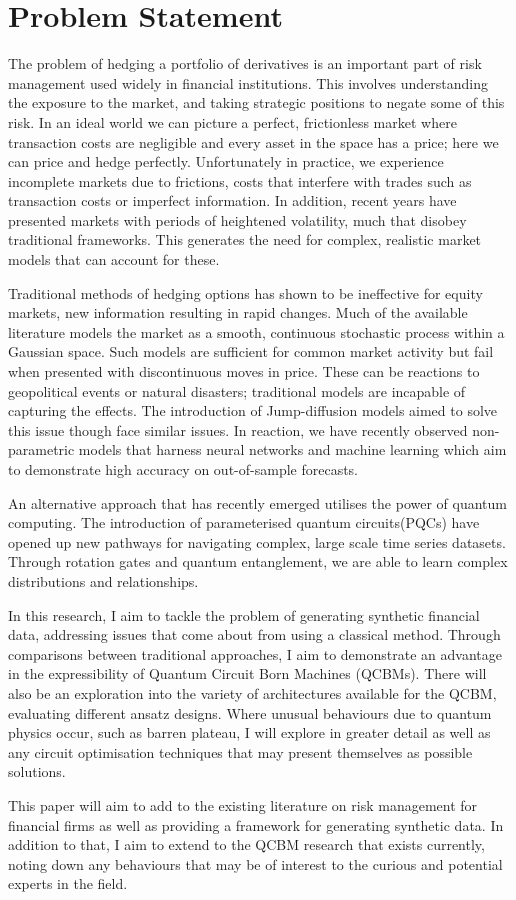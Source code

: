 \documentclass[12pt]{article}
\newcommand{\newp}
    {
    \vskip 0.5cm 
  }
\numberwithin{equation}{section}
\begin{document}
\section{Problem Statement}
The problem of hedging a portfolio of derivatives is an important part of 
risk management used widely in financial institutions. This involves understanding 
the exposure to the market, and taking strategic positions to negate some of this 
risk. In an ideal world we can picture a perfect, 
frictionless market where transaction costs are negligible and every asset in 
the space has a price; here we can price and hedge perfectly. Unfortunately in 
practice, we experience incomplete markets due to frictions, costs that interfere 
with trades such as transaction costs or imperfect information. In addition, recent 
years have presented markets with periods of heightened volatility, much that disobey 
traditional frameworks. This generates the need for complex, realistic market 
models that can account for these.
\newp
Traditional methods of hedging options has shown to be ineffective for equity 
markets, new information resulting in rapid changes. Much of the available 
literature models the market as a smooth, continuous stochastic process within 
a Gaussian space. Such models are sufficient for common market activity but fail 
when presented with discontinuous moves in price. These can be reactions to 
geopolitical events or natural disasters; traditional
models are incapable of capturing the effects. The introduction of Jump-diffusion 
models aimed to solve this issue though face similar issues. In reaction, we have 
recently observed non-parametric models that harness neural networks and machine 
learning which aim to demonstrate high accuracy on out-of-sample forecasts.
\newp
An alternative approach that has recently emerged utilises the power of 
quantum computing. The introduction of parameterised quantum circuits(PQCs) have 
opened up new pathways for navigating complex, large scale time series datasets. 
Through rotation gates and quantum entanglement, we are able to learn complex 
distributions and relationships. 
\newp
In this research, I aim to tackle the problem 
of generating synthetic financial data, addressing issues that come about from 
using a classical method. Through comparisons between traditional approaches, 
I aim to demonstrate an advantage in the expressibility of Quantum Circuit Born 
Machines (QCBMs). There will also be an exploration into the variety of architectures 
available for the QCBM, evaluating different ansatz designs. Where unusual behaviours
due to quantum physics occur, such as barren plateau, I will explore in greater detail 
as well as any circuit optimisation techniques that may present themselves as 
possible solutions. 
\newp
This paper will aim to add to the existing literature on risk management for 
financial firms as well as providing a framework for generating synthetic 
data. In addition to that, I aim to extend to the QCBM research that exists 
currently, noting down any behaviours that may be of interest to the curious 
and potential 
experts in the field. 
\clearpage
\end{document}
